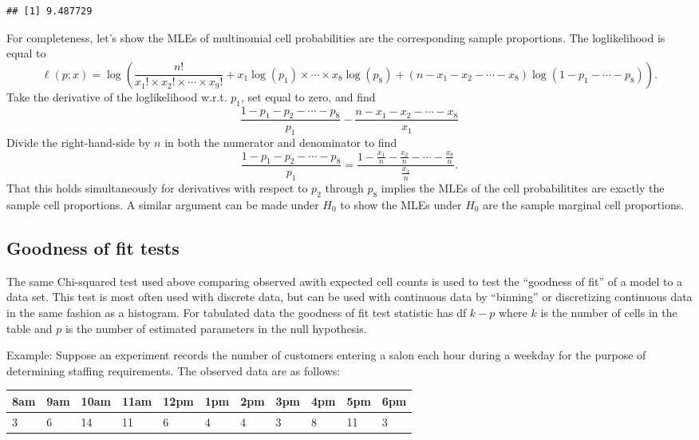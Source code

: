 \documentclass[
]{book}
\begin{document}
\begin{verbatim}
## [1] 9.487729
\end{verbatim}

For completeness, let's show the MLEs of multinomial cell probabilities are the corresponding sample proportions. The loglikelihood is equal to
\[\ell(p;x) = \log \left(\frac{n!}{x_1!\times x_2!\times \cdots\times x_9!} + x_1\log(p_1) \times \cdots \times x_8 \log(p_8) + (n-x_1-x_2-\cdots -x_8)\log(1-p_1-\cdots -p_8)\right).\]
Take the derivative of the loglikelihood w.r.t. \(p_1\), set equal to zero, and find
\[\frac{1 - p_1 - p_2 - \cdots - p_8}{p_1} - \frac{n-x_1-x_2-\cdots -x_8}{x_1}\]
Divide the right-hand-side by \(n\) in both the numerator and denominator to find
\[\frac{1 - p_1 - p_2 - \cdots - p_8}{p_1} = \frac{1-\frac{x_1}{n} - \frac{x_2}{n}-\cdots - \frac{x_8}{n}}{\frac{x_1}{n}}.\]
That this holds simultaneously for derivatives with respect to \(p_2\) through \(p_8\) implies the MLEs of the cell probabilitites are exactly the sample cell proportions. A similar argument can be made under \(H_0\) to show the MLEs under \(H_0\) are the sample marginal cell proportions.

\hypertarget{goodness-of-fit-tests}{%
\subsection{Goodness of fit tests}\label{goodness-of-fit-tests}}

The same Chi-squared test used above comparing observed awith expected cell counts is used to test the ``goodness of fit'' of a model to a data set. This test is most often used with discrete data, but can be used with continuous data by ``binning'' or discretizing continuous data in the same fashion as a histogram. For tabulated data the goodness of fit test statistic has df \(k-p\) where \(k\) is the number of cells in the table and \(p\) is the number of estimated parameters in the null hypothesis.

Example: Suppose an experiment records the number of customers entering a salon each hour during a weekday for the purpose of determining staffing requirements. The observed data are as follows:

\begin{longtable}[]{@{}lllllllllll@{}}
\toprule
8am & 9am & 10am & 11am & 12pm & 1pm & 2pm & 3pm & 4pm & 5pm & 6pm \\
\midrule
\endhead
3 & 6 & 14 & 11 & 6 & 4 & 4 & 3 & 8 & 11 & 3 \\
\bottomrule
\end{longtable}
\end{document}
